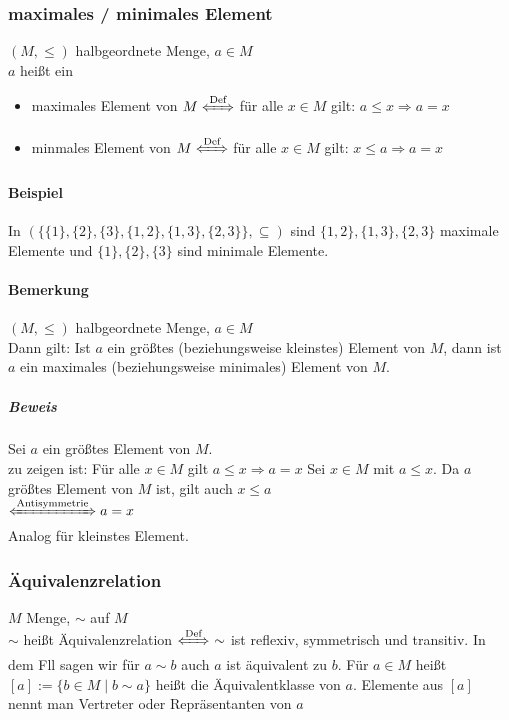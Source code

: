 \documentclass[a4paper]{scrartcl}
\theoremstyle{definition}
\theoremstyle{plain}
\theoremstyle{plain}
\theoremstyle{remark}
\theoremstyle{remark}
\theoremstyle{remark}
\begin{document}
\subsubsection{maximales / minimales Element}
\label{sec-2-5-5}
$(M,\leq)$ halbgeordnete Menge, $a\in M$ \\
    $a$ heißt ein
\begin{itemize}
\item maximales Element von $M \xLeftrightarrow{\text{Def}}$ für alle $x\in M$ gilt: $a\leq x \Rightarrow a = x$
\item minmales Element von $M \xLeftrightarrow{\text{Def}}$ für alle $x\in M$ gilt: $x\leq a \Rightarrow a = x$
\end{itemize}
\paragraph{Beispiel}
\label{sec-2-5-5-1}
In $(\{\{1\},\{2\},\{3\},\{1,2\},\{1,3\},\{2,3\}\}, \subseteq)$ sind $\{1,2\},\{1,3\},\{2,3\}$ maximale Elemente und $\{1\},\{2\},\{3\}$ sind minimale Elemente.
\paragraph{Bemerkung}
\label{sec-2-5-5-2}
$(M,\leq)$ halbgeordnete Menge, $a\in M$ \\
     Dann gilt: Ist $a$ ein größtes (beziehungsweise kleinstes) Element von $M$, dann ist $a$ ein maximales (beziehungsweise minimales) Element von $M$.
\subparagraph{Beweis}
\label{sec-2-5-5-2-1}
Sei $a$ ein größtes Element von $M$. \\
      zu zeigen ist: Für alle $x\in M$ gilt $a\leq x \Rightarrow a = x$
Sei $x\in M$ mit $a\leq x$. Da $a$ größtes Element von $M$ ist, gilt auch $x\leq a$ \\
      $\xLeftrightarrow{\text{Antisymmetrie}} a = x$ \\
      Analog für kleinstes Element.
\subsubsection{Äquivalenzrelation}
\label{sec-2-5-6}
$M$ Menge, $\sim$ auf $M$ \\
    $\sim$ heißt Äquivalenzrelation $\xLeftrightarrow{\text{Def}}~\sim$ ist reflexiv, symmetrisch und transitiv.
In dem Fll sagen wir für $a\sim b$ auch $a$ ist äquivalent zu $b$. Für $a\in M$ heißt $[a]:=\{b\in M \mid b\sim a\}$ heißt die Äquivalentklasse von $a$.
Elemente aus $[a]$ nennt man Vertreter oder Repräsentanten von $a$
\end{document}
